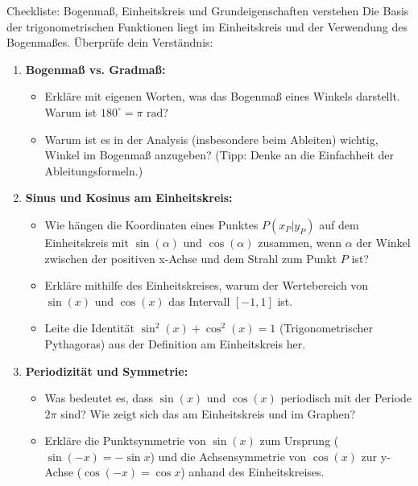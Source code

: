 \begin{aufgabenumgebung}{Checkliste: Bogenmaß, Einheitskreis und Grundeigenschaften verstehen}
Die Basis der trigonometrischen Funktionen liegt im Einheitskreis und der Verwendung des Bogenmaßes. Überprüfe dein Verständnis:

\begin{enumerate}[label=(\alph*)]
    \item \textbf{Bogenmaß vs. Gradmaß:}
    \begin{itemize}
        \item Erkläre mit eigenen Worten, was das Bogenmaß eines Winkels darstellt. Warum ist $180^\circ = \pi \text{ rad}$?
        \item Warum ist es in der Analysis (insbesondere beim Ableiten) wichtig, Winkel im Bogenmaß anzugeben? (Tipp: Denke an die Einfachheit der Ableitungsformeln.)
    \end{itemize}
    \item \textbf{Sinus und Kosinus am Einheitskreis:}
    \begin{itemize}
        \item Wie hängen die Koordinaten eines Punktes $P(x_P|y_P)$ auf dem Einheitskreis mit $\sin(\alpha)$ und $\cos(\alpha)$ zusammen, wenn $\alpha$ der Winkel zwischen der positiven x-Achse und dem Strahl zum Punkt $P$ ist?
        \item Erkläre mithilfe des Einheitskreises, warum der Wertebereich von $\sin(x)$ und $\cos(x)$ das Intervall $[-1, 1]$ ist.
        \item Leite die Identität $\sin^2(x) + \cos^2(x) = 1$ (Trigonometrischer Pythagoras) aus der Definition am Einheitskreis her.
    \end{itemize}
    \item \textbf{Periodizität und Symmetrie:}
    \begin{itemize}
        \item Was bedeutet es, dass $\sin(x)$ und $\cos(x)$ periodisch mit der Periode $2\pi$ sind? Wie zeigt sich das am Einheitskreis und im Graphen?
        \item Erkläre die Punktsymmetrie von $\sin(x)$ zum Ursprung ($\sin(-x)=-\sin x$) und die Achsensymmetrie von $\cos(x)$ zur y-Achse ($\cos(-x)=\cos x$) anhand des Einheitskreises.
    \end{itemize}
\end{enumerate}
\end{aufgabenumgebung}

